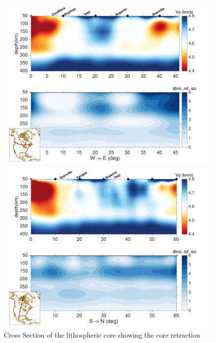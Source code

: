 \documentclass[12pt]{article}
\begin{document}
\begin{figure}
	\begin{minipage}{0.5\linewidth}
		\centerline{\includegraphics[width=\linewidth]{figures/profiles_WE-50.pdf}}
	\end{minipage}
	\hfill
	\begin{minipage}{0.5\linewidth}
		\centerline{\includegraphics[width=\linewidth]{figures/profiles_SN-100.pdf}}
	\end{minipage}

	\caption{Cross Section of the lithospheric core showing the core retraction}
	\label{cratoncrossedge}

\end{figure}
\end{document}
